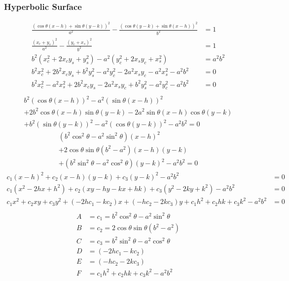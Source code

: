\subsubsection{Hyperbolic Surface}
\begin{equation}
\begin{split}
	\frac{(\cos\theta(x-h) + \sin\theta(y-k))^2}{a^2} - \frac{(\cos\theta(y-k) + \sin\theta(x-h))^2}{b^2} &= 1 \\
	\frac{(x_c + y_s)^2}{a^2} - \frac{(y_c + x_s)^2}{b^2} &= 1 \\
	b^2(x_c^2 + 2x_c y_s + y_s^2) - a^2(y_c^2 + 2 x_s y_c + x_s^2) &= a^2 b^2 \\
	b^2 x_c^2 + 2 b^2 x_c y_s + b^2 y_s^2 - a^2 y_c^2 - 2 a^2 x_s y_c - a^2 x_s^2 - a^2 b^2 &= 0 \\
	b^2 x_c^2 - a^2 x_s^2 + 2 b^2 x_c y_s - 2 a^2 x_s y_c + b^2 y_s^2 - a^2 y_c^2 - a^2 b^2 &= 0 \\
\end{split}
\end{equation}
\begin{multline*}
	b^2 (\cos\theta(x-h))^2 - a^2 (\sin\theta(x-h))^2 \\
	+ 2 b^2 \cos\theta(x-h) \sin\theta(y-k) - 2 a^2 \sin\theta(x-h) \cos\theta(y-k) \\
	+ b^2 (\sin\theta(y-k))^2 - a^2 (\cos\theta(y-k))^2 - a^2 b^2 = 0
\end{multline*}
\begin{multline*}
	(b^2 \cos^2\theta - a^2 \sin^2\theta)(x-h)^2 \\
	+ 2 \cos\theta\sin\theta(b^2 - a^2)(x-h)(y-k) \\
	+ (b^2 \sin^2\theta - a^2 \cos^2\theta)(y-k)^2 - a^2 b^2 = 0
\end{multline*}
\begin{equation*}
	\begin{split}
		c_1(x-h)^2 + c_2(x-h)(y-k) + c_3(y-k)^2 - a^2 b^2 &= 0 \\
		c_1(x^2-2hx + h^2) + c_2(xy-hy-kx+hk) + c_3(y^2-2ky+k^2) - a^2 b^2 &= 0 \\
		c_1 x^2 + c_2 xy + c_3 y^2 + (-2h c_1 -k c_2) x + (-h c_2 -2k c_3)y + c_1 h^2 + c_2 hk + c_3 k^2 - a^2 b^2 &= 0 \\
	\end{split}
\end{equation*}
\begin{align*}
	A &= c_1 = b^2 \cos^2\theta - a^2 \sin^2\theta \\
	B &= c_2 = 2 \cos\theta\sin\theta(b^2 - a^2) \\
	C &= c_3 = b^2 \sin^2\theta - a^2 \cos^2\theta \\
	D &= (-2h c_1 -k c_2) \\
	E &= (-h c_2 -2k c_3) \\
	F &= c_1 h^2 + c_2 hk + c_3 k^2 - a^2 b^2
\end{align*}

